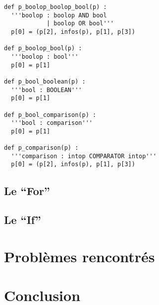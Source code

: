 \documentclass[a4paper,10pt]{article}
\begin{document}
\begin{lstlisting}
def p_boolop_boolop_bool(p) :
  '''boolop : boolop AND bool
            | boolop OR bool'''
  p[0] = (p[2], infos(p), p[1], p[3])

def p_boolop_bool(p) :
  '''boolop : bool'''
  p[0] = p[1]

def p_bool_boolean(p) :
  '''bool : BOOLEAN'''
  p[0] = p[1]

def p_bool_comparison(p) :
  '''bool : comparison'''
  p[0] = p[1]

def p_comparison(p) :
  '''comparison : intop COMPARATOR intop'''
  p[0] = (p[2], infos(p), p[1], p[3])
\end{lstlisting}

\subsection{Le ``For''}
\subsection{Le ``If''}
\section{Problèmes rencontrés}
\section{Conclusion}
\end{document}
